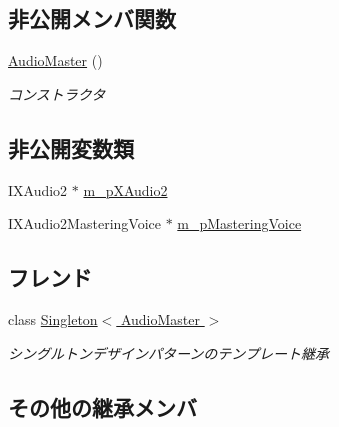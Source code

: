 \subsection*{非公開メンバ関数}
\begin{DoxyCompactItemize}
\item 
\hyperlink{class_d3_d11_1_1_sound_1_1_audio_master_a88a023f4855786ba194f94086e7dedcf}{Audio\+Master} ()\hypertarget{class_d3_d11_1_1_sound_1_1_audio_master_a88a023f4855786ba194f94086e7dedcf}{}\label{class_d3_d11_1_1_sound_1_1_audio_master_a88a023f4855786ba194f94086e7dedcf}

\begin{DoxyCompactList}\small\item\em コンストラクタ \end{DoxyCompactList}\end{DoxyCompactItemize}
\subsection*{非公開変数類}
\begin{DoxyCompactItemize}
\item 
I\+X\+Audio2 $\ast$ \hyperlink{class_d3_d11_1_1_sound_1_1_audio_master_a52b9a0c3a04bc541f3eed2b0ca8263ee}{m\+\_\+p\+X\+Audio2}
\item 
I\+X\+Audio2\+Mastering\+Voice $\ast$ \hyperlink{class_d3_d11_1_1_sound_1_1_audio_master_afcd3967aaff9b5b5d845d1af09173b48}{m\+\_\+p\+Mastering\+Voice}
\end{DoxyCompactItemize}
\subsection*{フレンド}
\begin{DoxyCompactItemize}
\item 
class \hyperlink{class_d3_d11_1_1_sound_1_1_audio_master_a1f496f9283cb43702c06608d38dc22d2}{Singleton$<$ Audio\+Master $>$}\hypertarget{class_d3_d11_1_1_sound_1_1_audio_master_a1f496f9283cb43702c06608d38dc22d2}{}\label{class_d3_d11_1_1_sound_1_1_audio_master_a1f496f9283cb43702c06608d38dc22d2}

\begin{DoxyCompactList}\small\item\em シングルトンデザインパターンのテンプレート継承 \end{DoxyCompactList}\end{DoxyCompactItemize}
\subsection*{その他の継承メンバ}



